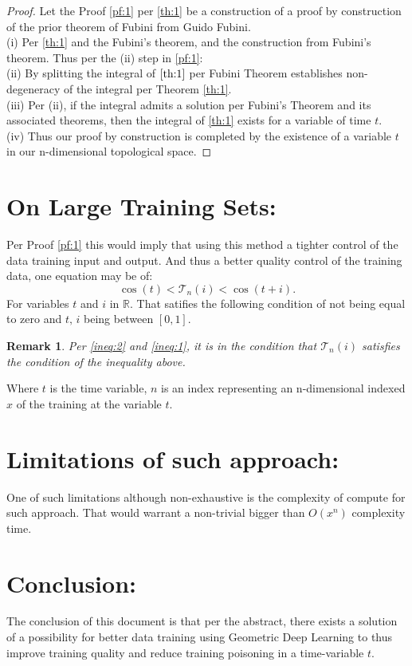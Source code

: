 \documentclass{article}
\newtheorem{remark}{Remark}
\begin{document}
	\begin{proof}
		\label{pf:1}
		Let the Proof \ref{pf:1} per \ref{th:1} be a construction of a proof by construction of the prior theorem of Fubini from Guido Fubini.\\
		(i) Per \ref{th:1} and the Fubini's theorem, and the construction from Fubini's theorem. Thus per the (ii) step in \ref{pf:1}:\\
		(ii) By splitting the integral of $\ref{th:1}$ per Fubini Theorem establishes non-degeneracy of the integral per Theorem \ref{th:1}.\\
		(iii) Per (ii), if the integral admits a solution per Fubini's Theorem and its associated theorems, then the integral of \ref{th:1} exists for a variable of time $t.$\\
		(iv) Thus our proof by construction is completed by the existence of a variable $t$ in our n-dimensional topological space.
	\end{proof}
	
	\section{On Large Training Sets:}
	Per Proof \ref{pf:1} this would imply that using this method a tighter control of the data training input and output. And thus a better quality control of the training data, one equation may be of:
	\begin{equation}
		\label{ineq:2}
		\cos(t) < \mathcal{T}_n(i) < \cos(t + i).
	\end{equation}
	For variables $t$ and $i$ in $\mathbb{R}.$ That satifies the following condition of not being equal to zero and $t, \, i$ being between $[0, 1]$.
	\begin{remark}
		Per \ref{ineq:2} and \ref{ineq:1}, it is in the condition that $\mathcal{T}_n(i)$ satisfies the condition of the inequality above. 
	\end{remark}
	Where $t$ is the time variable, $n$ is an index representing an n-dimensional indexed $x$ of the training at the variable $t$. 
	
	\section{Limitations of such approach:}
	One of such limitations although non-exhaustive is the complexity of compute for such approach. That would warrant a non-trivial bigger than $O(x^n)$ complexity time.
	
	\section{Conclusion:}
	The conclusion of this document is that per the abstract, there exists a solution of a possibility for better data training using Geometric Deep Learning to thus improve training quality and reduce training poisoning in a time-variable $t$.
	
	\nocite{*}
	
	
	
\end{document}

